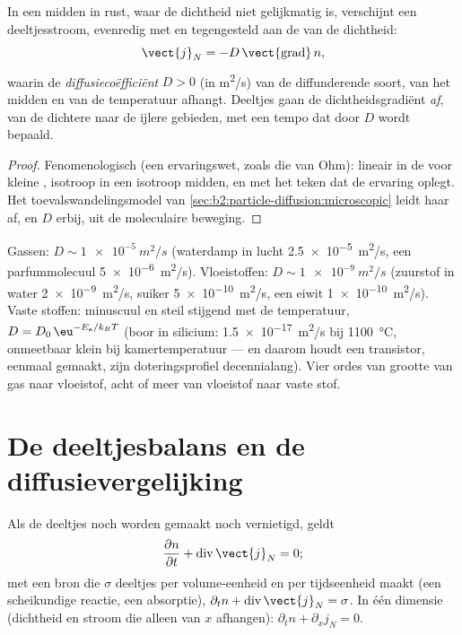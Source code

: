 \begin{theorem}\label{thm:b2:particle-diffusion:fick}
In een midden in rust, waar de dichtheid niet gelijkmatig is, verschijnt een
deeltjesstroom, evenredig met en tegengesteld aan de  van de
dichtheid:
\[
\vect{j}_N = -D\,\vect{\operatorname{grad}}\,n ,
\]
waarin de \emph{diffusiecoëfficiënt}
$D > 0$ (in \unit{m^2/s}) van de diffunderende soort, van het
midden en van de temperatuur afhangt. Deeltjes gaan de
dichtheidsgradiënt \emph{af}, van de dichtere naar de ijlere gebieden, met
een tempo dat door $D$ wordt bepaald.
\end{theorem}

\begin{proof}
Fenomenologisch (een ervaringswet, zoals die van Ohm): lineair in de
 voor kleine , isotroop in een isotroop midden, en
met het teken dat de ervaring oplegt. Het toevalswandelingsmodel van
\cref{sec:b2:particle-diffusion:microscopic} leidt haar af, en $D$ erbij,
uit de moleculaire beweging.
\end{proof}

\begin{example}\label{ex:b2:particle-diffusion:orders}
Gassen: $D \sim \qty{1e-5}{m^2/s}$ (waterdamp in lucht
\qty{2.5e-5}{m^2/s}, een parfummolecuul \qty{5e-6}{m^2/s}). Vloeistoffen:
$D \sim \qty{1e-9}{m^2/s}$ (zuurstof in water \qty{2e-9}{m^2/s}, suiker
\qty{5e-10}{m^2/s}, een eiwit \qty{1e-10}{m^2/s}). Vaste stoffen: minuscuul en
steil stijgend met de temperatuur, $D = D_0\,\eu^{-E_{\text{a}}/k_BT}$
(boor in silicium: \qty{1.5e-17}{m^2/s} bij \qty{1100}{\celsius},
onmeetbaar klein bij kamertemperatuur --- en daarom houdt een transistor,
eenmaal gemaakt, zijn doteringsprofiel decennialang). Vier ordes van
grootte van gas naar vloeistof, acht of meer van vloeistof naar vaste stof.
\end{example}

\section{De deeltjesbalans en de diffusievergelijking}

\begin{theorem}\label{thm:b2:particle-diffusion:balance}
Als de deeltjes noch worden gemaakt noch vernietigd, geldt
\[
\frac{\partial n}{\partial t} + \operatorname{div}\vect{j}_N = 0 ;
\]
met een bron die $\sigma$ deeltjes per volume-eenheid en per tijdseenheid maakt
(een scheikundige reactie, een absorptie),
$\partial_t n +
\operatorname{div}\vect{j}_N = \sigma$. In één dimensie
(dichtheid en
stroom die alleen van $x$ afhangen): $\partial_t n + \partial_x j_N = 0$.
\end{theorem}

